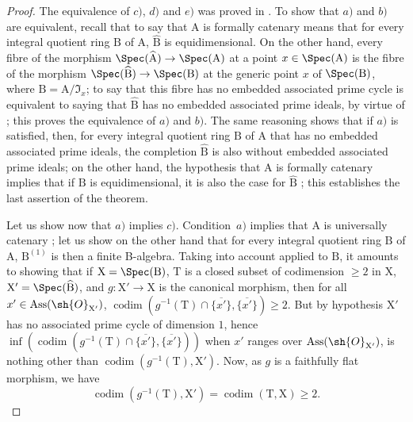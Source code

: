 \begin{proof}
The equivalence of $c)$, $d)$ and $e)$ was proved in .
To show that $a)$ and $b)$ are equivalent, recall  that to say that $\mathrm{A}$ is formally catenary means that for every integral quotient ring $\mathrm{B}$ of $\mathrm{A}$, $\widehat{\mathrm{B}}$ is equidimensional.
On the other hand, every fibre of the morphism $\Spec(\widehat{\mathrm{A}})\to\Spec(\mathrm{A})$ at a point $x\in\Spec(\mathrm{A})$ is the fibre of the morphism $\Spec(\widehat{\mathrm{B}})\to\Spec(\mathrm{B})$ at the generic point $x$ of $\Spec(\mathrm{B})$, where $\mathrm{B}=\mathrm{A}/\mathfrak{I}_x$; to say that this fibre has no embedded associated prime cycle is equivalent to saying that $\widehat{\mathrm{B}}$ has no embedded associated prime ideals, by virtue of ; this proves the equivalence of $a)$ and $b)$.
The same reasoning shows that if $a)$ is satisfied, then, for every integral quotient ring $\mathrm{B}$ of $\mathrm{A}$ that has no embedded associated prime ideals, the completion $\widehat{\mathrm{B}}$ is also without embedded associated prime ideals; on the other hand, the hypothesis that $\mathrm{A}$ is formally catenary implies that if $\mathrm{B}$ is equidimensional, it is also the case for $\widehat{\mathrm{B}}$ ; this establishes the last assertion of the theorem.

Let us show now that $a)$ implies $c)$.
Condition~$a)$ implies that $\mathrm{A}$ is universally catenary ; let us show on the other hand that for every integral quotient ring $\mathrm{B}$ of $\mathrm{A}$, $\mathrm{B}^{(1)}$ is then a finite B-algebra.
Taking into account  applied to $\mathrm{B}$, it amounts to showing that if $\mathrm{X}=\Spec(\mathrm{B})$, $\mathrm{T}$ is a closed subset of codimension $\geqslant 2$ in $\mathrm{X}$, $\mathrm{X}'=\Spec(\widehat{\mathrm{B}})$, and $g:\mathrm{X}'\to\mathrm{X}$ is the canonical morphism, then for all $x'\in\operatorname{Ass}(\sh{O}_{\mathrm{X}'})$, $\operatorname{codim}(g^{-1}(\mathrm{T})\cap\overline{\{x'\}},\overline{\{x'\}})\geqslant 2$.
But by hypothesis $\mathrm{X}'$ has no associated prime cycle of dimension $1$, hence $\inf(\operatorname{codim}(g^{-1}(\mathrm{T})\cap\overline{\{x'\}},\overline{\{x'\}}))$ when $x'$ ranges over $\operatorname{Ass}(\sh{O}_{\mathrm{X}'})$, is nothing other than $\operatorname{codim}(g^{-1}(\mathrm{T}),\mathrm{X}')$.
Now, as $g$ is a faithfully flat morphism, we have 
\[
  \operatorname{codim}(g^{-1}(\mathrm{T}),\mathrm{X}')=\operatorname{codim}(\mathrm{T},\mathrm{X})\geqslant 2.
\]


\end{proof}
